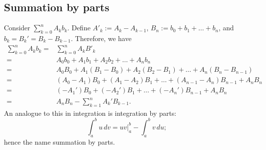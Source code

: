 \subsection{Summation by parts}
Consider \(\displaystyle\sum_{k=0}^{n}A_kb_k\). Define \(A'_k:=A_k-A_{k-1}\), \(B_n:=b_0+b_1+\dots+b_n\), and \(b_k=B_k'=B_k-B_{k-1}\). Therefore, we have 
\begin{align*}
	\sum_{k=0}^{n}A_kb_k=&\sum_{k=0}^{n}A_kB'_k\\
	  =&A_0b_0+A_1b_1+A_2b_2+\dots+A_nb_n\\
	  =&A_0B_0+A_1(B_1-B_0)+A_2(B_2-B_1)+\dots+A_n(B_n-B_{n-1})\\
	  =&(A_0-A_1)B_0+(A_1-A_2)B_1+\dots+(A_{n-1}-A_n)B_{n-1}+A_nB_n\\
	  =&(-A_1')B_0+(-A_2')B_1+\dots+(-A_n')B_{n-1}+A_nB_n\\
	  =&A_nB_n-\sum_{k=1}^nA_k'B_{k-1}.
\end{align*}
An analogue to this in integration is integration by parts:
\begin{equation*}
	\int_a^bu \, dv=uv|_a^b-\int_a^b v \, du;
\end{equation*}
hence the name summation by parts.

